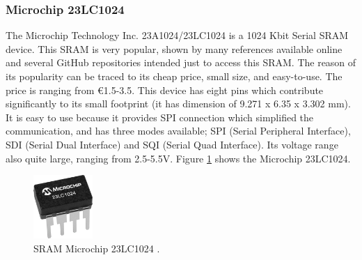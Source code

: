 \subsubsection{Microchip 23LC1024}
The Microchip Technology Inc. 23A1024/23LC1024 is a 1024 Kbit Serial SRAM device. This SRAM is very popular, shown by many references available online and several GitHub repositories intended just to access this SRAM. The reason of its popularity can be traced to its cheap price, small size, and easy-to-use. The price is ranging from \euro{}1.5-3.5. This device has eight pins which contribute significantly to its small footprint (it has dimension of 9.271 x 6.35 x 3.302 mm).
It is easy to use because it provides SPI connection which simplified the communication, and has three modes available; SPI (Serial Peripheral Interface), SDI (Serial Dual Interface) and SQI (Serial Quad Interface). Its voltage range also quite large, ranging from 2.5-5.5V. Figure \ref{fig:23LC1024} shows the Microchip 23LC1024.

\begin{figure}[tph!]
    \centerline{\includegraphics[width={0.2\textwidth}]{images/23lc1024}}
    \caption{SRAM Microchip 23LC1024 \cite{23lc1024}.}
    \label{fig:23LC1024}
\end{figure}

